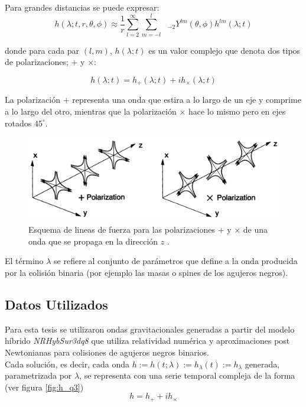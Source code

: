 Para grandes distancias se puede expresar:
\begin{equation} \label{eq:modes}
h( \lambda; t, r, \theta , \phi) \approx \frac{1}{r}  \sum_{l=2}^{\infty}  \sum_{m=-l}^{l} \text{ }_{-2} Y^{lm} (\theta, \phi) h^{lm}(\lambda; t)
\end{equation}

donde para cada par $(l, m)$, $h(\lambda; t)$ es un valor complejo que denota dos tipos de polarizaciones; $+$ y $\times$:

\begin{equation}
h(\lambda; t) = h_{+}(\lambda; t) + i h_{\times}(\lambda; t)
\end{equation}

La polarización $+$ representa una onda que estira a lo largo de un eje y comprime a lo largo del otro, mientras que la polarización $\times$ hace lo mismo pero en ejes rotados $45^{\circ}$.



\begin{figure}[h!]
\centering
\includegraphics[width=.75\columnwidth]{figs/polarizaciones.png}
\caption{Esquema de lineas de fuerza para las polarizaciones + y $\times$ de una onda que se propaga en la dirección $z$ \cite{Centrella_2010}.}
\label{fig:+x}
\end{figure}


El término $\lambda$ se refiere al conjunto de parámetros que define a la onda producida por la colisión binaria (por ejemplo las masas o spines de los agujeros negros).


\subsection*{Datos Utilizados}

Para esta tesis se utilizaron ondas gravitacionales generadas a partir del modelo híbrido \textit{NRHybSur3dq8}\cite{Varma_2019} que utiliza relatividad numérica y aproximaciones post Newtonianas para colisiones de agujeros negros binarios.
\\

Cada solución, es decir, cada onda \( h := h(t; \lambda) := h_{\lambda}(t) := h_{\lambda} \) generada, parametrizada por $\lambda$, se representa con una serie temporal compleja de la forma (ver figura \ref{fig:h_q3})
\[
h = h_+ + ih_{\times}
\]

